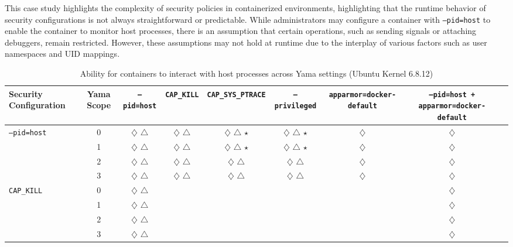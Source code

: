 \documentclass[12pt]{report}
\begin{document}
\begin{doublespace}
This case study highlights the complexity of security policies in containerized environments, highlighting that the runtime behavior of security configurations is not always straightforward or predictable. While administrators may configure a container with \texttt{--pid=host} to enable the container to monitor host processes, there is an assumption that certain operations, such as sending signals or attaching debuggers, remain restricted. However, these assumptions may not hold at runtime due to the interplay of various factors such as user namespaces and UID mappings.


\begin{table}[!h]
    \centering
    \footnotesize
    \setlength{\tabcolsep}{4pt}
    \renewcommand{\arraystretch}{1.1}
    \caption{Ability for containers to interact with host processes across Yama settings (Ubuntu Kernel 6.8.12)}
    \label{tab:combined-pid-namespace-security}
    \begin{adjustbox}{max width=\textwidth}
    \begin{tabular}{|l|c|c|c|c|c|c|c|c|}
        \hline
        \textbf{Security Configuration} & \textbf{Yama Scope} & \texttt{--pid=host} & \texttt{CAP\_KILL} & \texttt{CAP\_SYS\_PTRACE} & \texttt{--privileged} & \texttt{apparmor=docker-default} & \texttt{--pid=host + apparmor=docker-default} \\
        \hline

        \multirow{4}{*}{\texttt{--pid=host}} 
            & 0 & $\diamondsuit$ $\triangle$ & $\diamondsuit$ $\triangle$ & $\diamondsuit$ $\triangle$ $\star$ & $\diamondsuit$ $\triangle$ $\star$ & $\diamondsuit$ & $\diamondsuit$ \\
            & 1 & $\diamondsuit$ $\triangle$ & $\diamondsuit$ $\triangle$ & $\diamondsuit$ $\triangle$ $\star$ & $\diamondsuit$ $\triangle$ $\star$ & $\diamondsuit$ & $\diamondsuit$ \\
            & 2 & $\diamondsuit$ $\triangle$ & $\diamondsuit$ $\triangle$ & $\diamondsuit$ $\triangle$ & $\diamondsuit$ $\triangle$ & $\diamondsuit$ & $\diamondsuit$ \\
            & 3 & $\diamondsuit$ $\triangle$ & $\diamondsuit$ $\triangle$ & $\diamondsuit$ $\triangle$ & $\diamondsuit$ $\triangle$ & $\diamondsuit$ & $\diamondsuit$ \\
        \hline

        \multirow{4}{*}{\texttt{CAP\_KILL}} 
            & 0 & $\diamondsuit$ $\triangle$ &  &  &  &  & $\diamondsuit$ \\
            & 1 & $\diamondsuit$ $\triangle$ &  &  &  &  & $\diamondsuit$ \\
            & 2 & $\diamondsuit$ $\triangle$ &  &  &  &  & $\diamondsuit$ \\
            & 3 & $\diamondsuit$ $\triangle$ &  &  &  &  & $\diamondsuit$ \\
        \hline


\end{tabular}
\end{adjustbox}
\end{table}
\end{doublespace}
\end{document}
